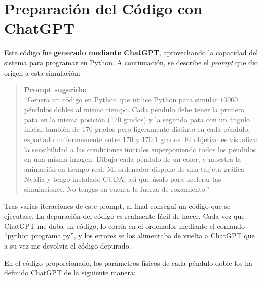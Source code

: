 \documentclass[
  10pt,
  a4paper,
  DIV=11,
  numbers=noendperiod,
  open=any]{scrreprt}
\numberwithin{equation}{chapter}
\numberwithin{equation}{section}
\renewcommand{\[}{\begin{equation}}
\renewcommand{\]}{\end{equation}}
\begin{document}
\section{Preparación del Código con
ChatGPT}\label{preparaciuxf3n-del-cuxf3digo-con-chatgpt}

Este código fue \textbf{generado mediante ChatGPT}, aprovechando la
capacidad del sistema para programar en Python. A continuación, se
describe el \emph{prompt} que dio origen a esta simulación:

\begin{quote}
\textbf{Prompt sugerido:}\\
``Genera un código en Python que utilice Python para simular \(10000\)
péndulos dobles al mismo tiempo. Cada péndulo debe tener la primera pata
en la misma posición (170 grados) y la segunda pata con un ángulo
inicial también de 170 grados pero ligeramente distinto en cada péndulo,
espaciado uniformemente entre 170 y 170.1 grados. El objetivo es
visualizar la sensibilidad a las condiciones iniciales superponiendo
todos los péndulos en una misma imagen. Dibuja cada péndulo de un color,
y muestra la animación en tiempo real. Mi ordenador dispone de una
tarjeta gráfica Nvidia y tengo instalado CUDA, así que úsalo para
acelerar las simulaciones. No tengas en cuenta la fuerza de
rozamiento.''
\end{quote}

Tras varias iteraciones de este prompt, al final conseguí un código que
se ejecutase. La depuración del código es realmente fácil de hacer. Cada
vez que ChatGPT me daba un código, lo corría en el ordenador mediante el
comando ``python programa.py'', y los errores se los alimentaba de
vuelta a ChatGPT que a su vez me devolvía el código depurado.

En el código proporcionado, los parámetros físicos de cada péndulo doble
los ha definido ChatGPT de la siguiente manera:
\end{document}
